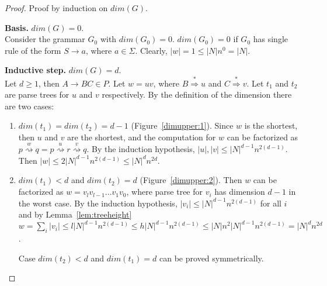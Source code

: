 \documentclass[11pt,a4paper]{article} %
\newcommand{\xra}[1]{\overset{#1}{\rightsquigarrow}}
\begin{document}
\begin{proof}
Proof by induction on $dim(G)$.

\textbf{Basis.} $dim(G) = 0$.
\\
Consider the grammar $G_0$ with $dim(G_0) = 0$. $dim(G_0)=0$ if $G_0$ has single rule of the form $S \rightarrow a$, where $a \in \Sigma$. Clearly, $|w| = 1 \leq |N| n^0 = |N|$.

\textbf{Inductive step.} $dim(G) = d$.
\\
Let $d \ge 1$, then $A \rightarrow BC \in P$. Let $w=uv$, where $B  \stackrel {*}{\Rightarrow } u$ and $C  \stackrel {*}{\Rightarrow } v$. Let $t_1$ and $t_2$ are parse trees for $u$ and $v$ respectively. By the definition of the dimension there are two cases:
\begin{enumerate}
\item $dim(t_1) = dim(t_2) = d-1$ (Figure~\ref{dimupper:1}). Since $w$ is the shortest, then $u$ and $v$ are the shortest, and the computation for $w$ can be factorized as $p \xra{w} q = p \xra{u} r \xra{v} q$. By the induction hypothesis, $|u|, |v| \leq |N|^{d-1} n^{2(d-1)}$. Then $|w| \leq 2|N|^{d-1} n^{2(d-1)} \leq |N|^d n^{2d}$.
\item $dim(t_1) < d$ and $dim(t_2) = d$  (Figure~\ref{dimupper:2}). Then $w$ can be factorized as $w = v_l v_{l-1} ...v_1 v_0$, where parse tree for $v_i$ has dimension $d-1$ in the worst case. By the induction hypothesis, $|v_i| \leq |N|^{d-1}n^{2(d-1)}$ for all $i$ and by Lemma~\ref{lem:treeheight} $w = \sum_i |v_i| \leq l |N|^{d-1}n^{2(d-1)} \leq h |N|^{d-1}n^{2(d-1)} \leq |N|n^2 |N|^{d-1}n^{2(d-1)} = |N|^d n^{2d}$.

Case $dim(t_2) < d$ and $dim(t_1) = d$ can be proved symmetrically.
\end{enumerate}
\end{proof}
\end{document}
